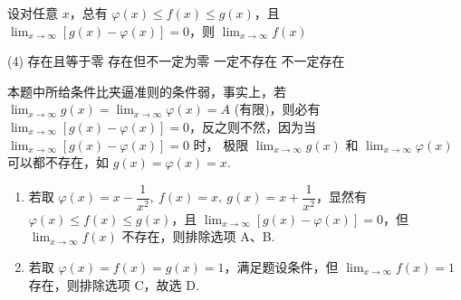 \begin{example}[2000 数三]
    设对任意 $x$，总有 $\varphi(x)\leqslant f(x)\leqslant g(x)$，且 $\displaystyle\lim_{x\to\infty}[g(x)-\varphi(x)]=0$，则 $\displaystyle\lim_{x\to\infty}f(x)$
    \begin{tasks}(4)
        \task 存在且等于零
        \task 存在但不一定为零
        \task 一定不存在
        \task 不一定存在
    \end{tasks}
\end{example}
\begin{solution}
    本题中所给条件比夹逼准则的条件弱，事实上，若 $\displaystyle\lim_{x\to\infty}g(x)=\lim_{x\to\infty}\varphi(x)=A$ (有限)，则必有 $\displaystyle\lim_{x\to\infty}[g(x)-\varphi(x)]=0$，反之则不然，因为当 $\displaystyle\lim_{x\to\infty}[g(x)-\varphi(x)]=0$ 时，
    极限 $\displaystyle\lim_{x\to\infty}g(x)$ 和 $\displaystyle\lim_{x\to\infty}\varphi(x)$ 可以都不存在，如 $g(x)=\varphi(x)=x$.
    \begin{enumerate}[label=(\arabic{*})]
        \item 若取 $\varphi(x)=x-\dfrac{1}{x^2},~f(x)=x,~g(x)=x+\dfrac{1}{x^2}$，显然有 $\varphi(x)\leqslant f(x)\leqslant g(x)$，且 $\displaystyle\lim_{x\to\infty}[g(x)-\varphi(x)]=0$，但 $\displaystyle\lim_{x\to\infty}f(x)$ 不存在，则排除选项 A、B.
        \item 若取 $\varphi(x)=f(x)=g(x)=1$，满足题设条件，但 $\displaystyle\lim_{x\to\infty}f(x)=1$ 存在，则排除选项 C，故选 D.
    \end{enumerate}
\end{solution}